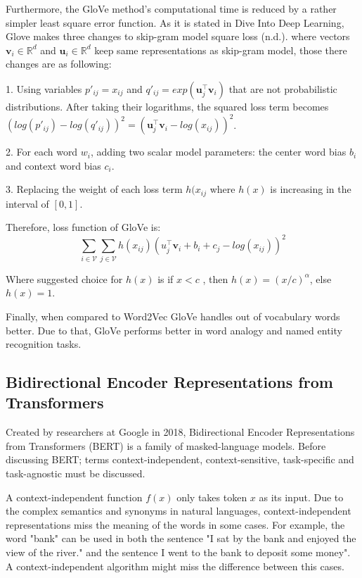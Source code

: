 \documentclass[man]{apa7}
\begin{document}
Furthermore, the GloVe method's computational time is reduced by a rather simpler least square error function. As it is stated in Dive Into Deep Learning, Glove makes three changes to skip-gram model square loss (n.d.). where vectors $\mathbf{v_\mathit{i}} \in \mathbb{R}^d$ and $\mathbf{u_\mathit{i}} \in \mathbb{R}^d$ keep same representations as skip-gram model, those there changes are as following:

1. Using variables $p'_{ij} = x_{ij}$ and $q'_{ij} = exp(\mathbf{u}_j^\top \mathbf{v}_i)$ that are not probabilistic distributions. After taking their logarithms, the squared loss term becomes $(log(p'_{ij})-log(q'_{ij}))^2 = (\mathbf{u}_j^\top \mathbf{v}_i - log (x_{ij}))^2$.

2. For each word $w_i$, adding two scalar model parameters: the center word bias $b_i$ and context word bias $c_i$.

3. Replacing the weight of each loss term $h(x_{ij}$ where $h(x)$ is increasing in the interval of $[0,1]$.
 
Therefore, loss function of GloVe is:
\begin{equation}
\sum_{i \in \mathcal{V}} \sum_{j \in \mathcal{V}} h(x_{ij})(u_j^\top \mathbf{v}_i + b_i +c_j -log(x_{ij}))^2
\end{equation}


Where suggested choice for $h(x)$ is if $x < c$ , then $h(x) = (x/c)^\alpha$, else $h(x) = 1$. 

Finally, when compared to Word2Vec GloVe handles out of vocabulary words better. Due to that, GloVe performs better in word analogy and named entity recognition tasks. 

\subsection{Bidirectional Encoder Representations from Transformers}
Created by researchers at Google in 2018, Bidirectional Encoder Representations from Transformers (BERT) is a family of masked-language models. Before discussing BERT; terms context-independent, context-sensitive, task-specific and task-agnostic must be discussed.

A context-independent function $f(x)$ only takes token $x$ as its input. Due to the complex semantics and synonyms in natural languages, context-independent representations miss the meaning of the words in some cases. For example, the word "bank" can be used in both the sentence "I sat by the bank and enjoyed the view of the river." and the sentence I went to the bank to deposit some money". A context-independent algorithm might miss the difference between this cases.
\end{document}
